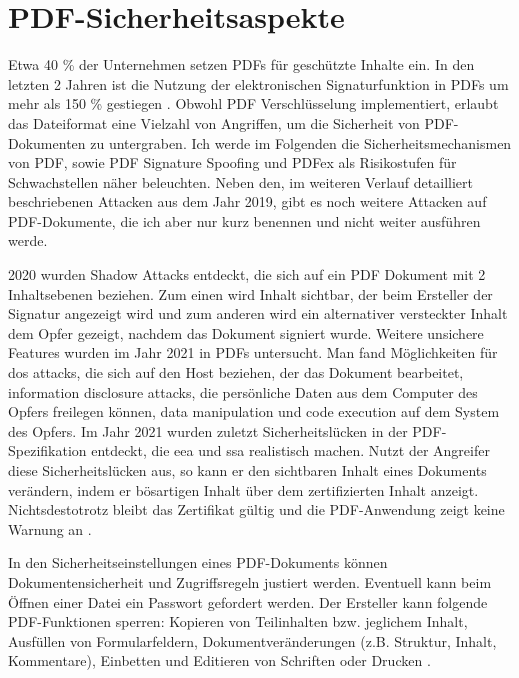 \section{PDF-Sicherheitsaspekte}
Etwa 40 \% der Unternehmen setzen PDFs für geschützte Inhalte ein. In den letzten 2 Jahren ist die Nutzung der elektronischen Signaturfunktion in PDFs um mehr als 150 \% gestiegen \cite{formilo}. Obwohl PDF Verschlüsselung implementiert, erlaubt das Dateiformat eine Vielzahl von Angriffen, um die Sicherheit von PDF-Dokumenten zu untergraben. Ich werde im Folgenden die Sicherheitsmechanismen von PDF, sowie PDF Signature Spoofing und PDFex als Risikostufen für Schwachstellen näher beleuchten. Neben den, im weiteren Verlauf detailliert beschriebenen Attacken aus dem Jahr 2019, gibt es noch weitere Attacken auf PDF-Dokumente, die ich aber nur kurz benennen und nicht weiter ausführen werde. 
\par
2020 wurden Shadow Attacks entdeckt, die sich auf ein PDF Dokument mit 2 Inhaltsebenen beziehen. Zum einen wird Inhalt sichtbar, der beim Ersteller der Signatur angezeigt wird und zum anderen wird ein alternativer versteckter Inhalt dem Opfer gezeigt, nachdem das Dokument signiert wurde. Weitere unsichere Features wurden im Jahr 2021 in PDFs untersucht. Man fand Möglichkeiten für \gls{dos} attacks, die sich auf den Host beziehen, der das Dokument bearbeitet, information disclosure attacks, die persönliche Daten aus dem Computer des Opfers freilegen können, data manipulation und code execution auf dem System des Opfers. Im Jahr 2021 wurden zuletzt Sicherheitslücken in der PDF-Spezifikation entdeckt, die \gls{eea} und \gls{ssa} realistisch machen. Nutzt der Angreifer diese Sicherheitslücken aus, so kann er den sichtbaren Inhalt eines Dokuments verändern, indem er bösartigen Inhalt über dem zertifizierten Inhalt anzeigt. Nichtsdestotrotz bleibt das Zertifikat gültig und die PDF-Anwendung zeigt keine Warnung an \cite{pdf-insec}.
\par
In den Sicherheitseinstellungen eines PDF-Dokuments können Dokumentensicherheit und Zugriffsregeln justiert werden. Eventuell kann beim Öffnen einer Datei ein Passwort gefordert werden. Der Ersteller kann folgende PDF-Funktionen sperren: Kopieren von Teilinhalten bzw. jeglichem Inhalt, Ausfüllen von Formularfeldern, Dokumentveränderungen (z.B. Struktur, Inhalt, Kommentare), Einbetten und Editieren von Schriften oder Drucken \cite{adobe-pdf-pades}. 

